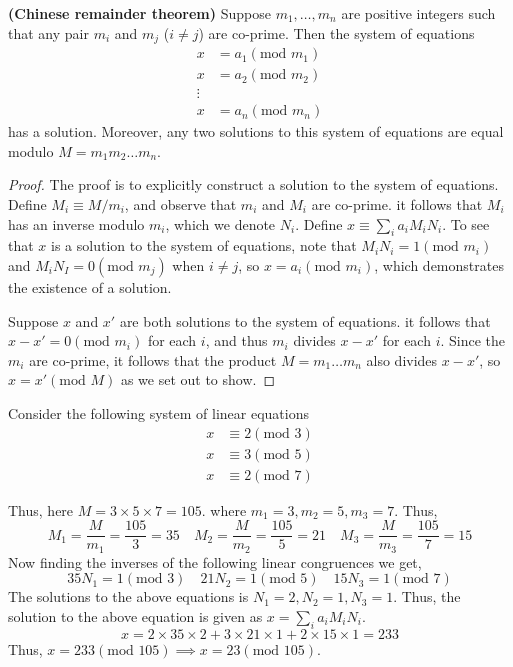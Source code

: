 \begin{theorem}
    \textbf{(Chinese remainder theorem)} Suppose $m_1,\ldots,m_n$ are positive integers such that any pair $m_i$ and $m_j$ ($i\neq j$) are co-prime. Then the system of equations 
    \begin{align*}
        x &= a_1 (\text{mod }m_1)\\
        x &= a_2 (\text{mod }m_2)\\
        \vdots\\
        x &= a_n(\text{mod } m_n)
    \end{align*}
    has a solution. Moreover, any two solutions to this system of equations are equal modulo $M=m_1m_2\ldots m_n$.
\end{theorem}
\begin{proof}
    The proof is to explicitly construct a solution to the system of equations. Define $M_i \equiv M/m_i$, and observe that $m_i$ and $M_i$ are co-prime. it follows that $M_i$ has an inverse modulo $m_i$, which we denote $N_i$. Define $x \equiv \sum_i a_iM_iN_i$. To see that $x$ is a solution to the system of equations, note that $M_iN_i=1 (\text{mod } m_i)$ and $M_iN_I=0(\text{mod }m_j)$ when $i\neq j$, so $x=a_i(\text{mod } m_i)$, which demonstrates the existence of a solution.

    Suppose $x$ and $x'$ are both solutions to the system of equations. it follows that $x-x'=0 (\text{mod } m_i)$ for each $i$, and thus $m_i$ divides $x-x'$ for each $i$. Since the $m_i$ are co-prime, it follows that the product $M=m_1\ldots m_n$ also divides $x-x'$, so $x=x'(\text{mod } M)$ as we set out to show.
\end{proof}

\begin{example}
    Consider the following system of linear equations
    \begin{align*}
        x &\equiv 2 (\text{mod }3)\\
        x &\equiv 3 (\text{mod }5)\\
        x&\equiv 2 (\text{mod }7)
    \end{align*}

    Thus, here $M=3\times 5\times 7 = 105$. where $m_1=3, m_2=5,m_3=7$. Thus, 
    \[
    M_1 = \frac{M}{m_1}=\frac{105}{3} = 35\quad M_2 = \frac{M}{m_2}=\frac{105}{5} =21 \quad M_3 = \frac{M}{m_3} = \frac{105}{7} = 15
    \]
    Now finding the inverses of the following linear congruences we get,
    \[
    35N_1 = 1(\text{mod }3)\quad 21N_2=1 (\text{mod }5)\quad 15N_3 =1(\text{mod }7)
    \]
    The solutions to the above equations is $N_1=2,N_2=1,N_3=1$. Thus, the solution to the above equation is given as $x=\sum_ia_iM_iN_i$.
    \[
    x=2\times 35 \times 2 + 3\times 21 \times 1 + 2 \times 15 \times 1 = 233
    \]
    Thus, $x=233 (\text{mod }105) \implies x=23 (\text{mod }105)$.
\end{example}


